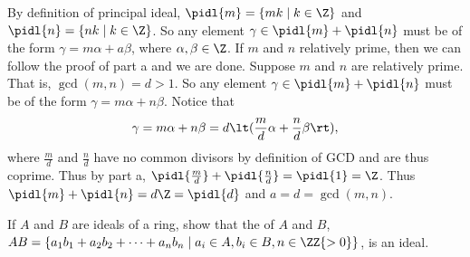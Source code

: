 \documentclass{article}
\begin{document}
\begin{solution}
\begin{enumerate}[label=\tbo{\alph*.}]
    By definition of principal ideal, \( \pidl{m}=\{mk\mid k\in\Z\} \) and \( \pidl{n}=\{nk\mid k\in\Z\} \).
    So any element \(\gamma\in\pidl{m} + \pidl{n} \) must be of the form \( \gamma=m\alpha+a\beta \), where \( \alpha,\beta\in\Z \).
    If \( m \) and \( n \) relatively prime, then we can follow the proof of part a and we are done.
    Suppose \( m \) and \( n \) are  relatively prime. That is, \( \gcd(m,n) = d > 1\). So any element \( \gamma\in\pidl{m}+\pidl{n} \) must be of the form \( \gamma=m\alpha+n\beta \). Notice that \begin{align*}
      \gamma = m\alpha+n\beta = d\lt(\frac{m}{d}\alpha+\frac{n}{d}\beta\rt),
    \end{align*} where \( \frac{m}{d} \) and \( \frac{n}{d} \) have no common divisors by definition of GCD and are thus coprime.
    Thus by part a, \( \pidl{\frac{m}{d}}+\pidl{\frac{n}{d}}=\pidl{1}=\Z \).
    Thus \( \pidl{m}+\pidl{n} = d\Z = \pidl{d} \) and \( a = d = \gcd(m,n) \).
\end{enumerate}
\end{solution}

If \( A \) and \( B \) are ideals of a ring, show that the  of \( A \) and \( B \), \( AB = \{a_1b_1 + a_2b_2 + \cdots + a_nb_n \mid a_i\in A, b_i\in B, n \in\ZZ{>0}\} \), is an ideal.
\end{document}

